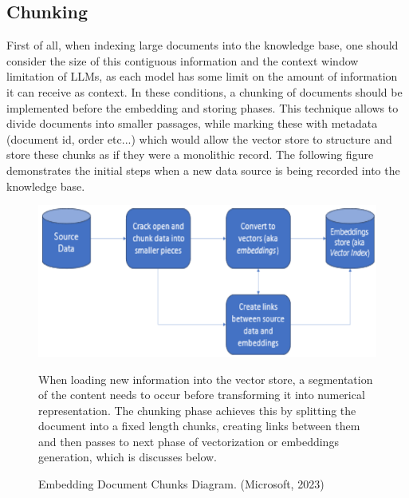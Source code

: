 \subsection{Chunking}
First of all, when indexing large documents into the knowledge base, one should consider the size of this contiguous information and the context window limitation of LLMs, as each model has some limit on the amount of information it can receive as context. In these conditions, a chunking of documents should be implemented before the embedding and storing phases. This technique allows to divide documents into smaller passages, while marking these with metadata (document id, order etc...) which would allow the vector store to structure and store these chunks as if they were a monolithic record.\newline
The following figure demonstrates the initial steps when a new data source is being recorded into the knowledge base.
\begin{figure}[H]
    \centering
    \includegraphics[width=.7\linewidth]{./figures/chunking-embedding-diagram.png}
    \caption{Embedding Document Chunks Diagram. (Microsoft, 2023)}
    \begin{flushleft}
        When loading new information into the vector store, a segmentation of the content needs to occur before transforming it into numerical representation. The chunking phase achieves this by splitting the document into a fixed length chunks, creating links between them and then passes to next phase of vectorization or embeddings generation, which is discusses below.
    \end{flushleft}
\end{figure}
